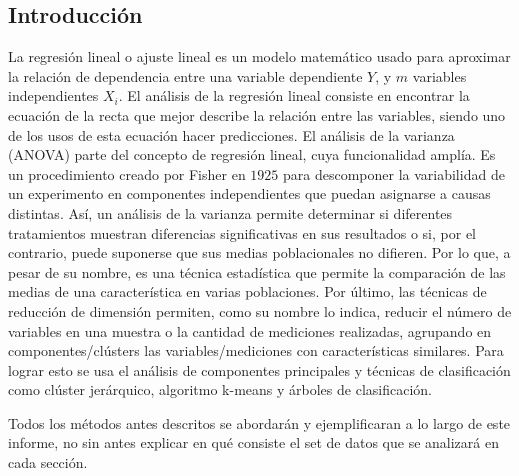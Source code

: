 \documentclass[twoside]{article}
\begin{document}
\begin{multicols}{2}

\section{Introducci\'on}
La regresi\'on lineal o ajuste lineal es un modelo matem\'atico usado para aproximar la relaci\'on de dependencia entre una variable dependiente $Y$, y $m$ variables independientes $X_i$. El an\'alisis de la regresi\'on lineal consiste en encontrar la ecuaci\'on de la recta que mejor describe la relaci\'on entre las variables, siendo uno de los usos de esta ecuaci\'on hacer predicciones. El an\'alisis de la varianza (ANOVA) parte del concepto de regresi\'on lineal, cuya funcionalidad ampl\'ia. Es un procedimiento creado por Fisher en $1925$ para descomponer la variabilidad de un experimento en componentes independientes que puedan asignarse a causas distintas. As\'i, un an\'alisis de la varianza permite determinar si diferentes tratamientos muestran diferencias significativas en sus resultados o si, por el contrario, puede suponerse que sus medias poblacionales no difieren. Por lo que, a pesar de su nombre, es una t\'ecnica estad\'istica que permite la comparaci\'on de las medias de una caracter\'istica en varias poblaciones. Por \'ultimo, las t\'ecnicas de reducci\'on de dimensi\'on permiten, como su nombre lo indica, reducir el n\'umero de variables en una muestra o la cantidad de mediciones realizadas, agrupando en componentes/cl\'usters las variables/mediciones con caracter\'isticas similares. Para lograr esto se usa el an\'alisis de componentes principales y t\'ecnicas de clasificaci\'on como cl\'uster jer\'arquico, algoritmo k-means y \'arboles de clasificaci\'on. 

Todos los m\'etodos antes descritos se abordar\'an y ejemplificaran a lo largo de este informe, no sin antes explicar en qu\'e consiste el set de datos que se analizar\'a en cada secci\'on.\\\\





\end{multicols}
\end{document}
